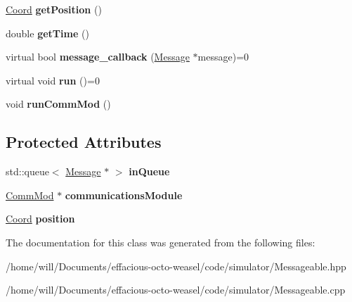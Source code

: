 \begin{DoxyCompactItemize}
\item 
\hyperlink{struct_coord}{Coord} {\bfseries get\+Position} ()\hypertarget{class_messageable_a7f990ea00748e817ef7a20dd9ab8e88c}{}\label{class_messageable_a7f990ea00748e817ef7a20dd9ab8e88c}

\item 
double {\bfseries get\+Time} ()\hypertarget{class_messageable_a695c9311c6ece88dd81ec325d24dc01e}{}\label{class_messageable_a695c9311c6ece88dd81ec325d24dc01e}

\item 
virtual bool {\bfseries message\+\_\+callback} (\hyperlink{class_message}{Message} $\ast$message)=0\hypertarget{class_messageable_adda0d24929a929b9d91c97da1fb91775}{}\label{class_messageable_adda0d24929a929b9d91c97da1fb91775}

\item 
virtual void {\bfseries run} ()=0\hypertarget{class_messageable_a82c2308b9fabe8e06664d17b3c018b75}{}\label{class_messageable_a82c2308b9fabe8e06664d17b3c018b75}

\item 
void {\bfseries run\+Comm\+Mod} ()\hypertarget{class_messageable_ab39d542fbac3744a22161efbe0dc9ff7}{}\label{class_messageable_ab39d542fbac3744a22161efbe0dc9ff7}

\end{DoxyCompactItemize}
\subsection*{Protected Attributes}
\begin{DoxyCompactItemize}
\item 
std\+::queue$<$ \hyperlink{class_message}{Message} $\ast$ $>$ {\bfseries in\+Queue}\hypertarget{class_messageable_a77bee602af65ca6708c3d77080298376}{}\label{class_messageable_a77bee602af65ca6708c3d77080298376}

\item 
\hyperlink{class_comm_mod}{Comm\+Mod} $\ast$ {\bfseries communications\+Module}\hypertarget{class_messageable_a0c8ed985c63492656ab9e6d502c8f98e}{}\label{class_messageable_a0c8ed985c63492656ab9e6d502c8f98e}

\item 
\hyperlink{struct_coord}{Coord} {\bfseries position}\hypertarget{class_messageable_a49ee36421becbc9f529f3d63d5e3169a}{}\label{class_messageable_a49ee36421becbc9f529f3d63d5e3169a}

\end{DoxyCompactItemize}


The documentation for this class was generated from the following files\+:\begin{DoxyCompactItemize}
\item 
/home/will/\+Documents/effacious-\/octo-\/weasel/code/simulator/Messageable.\+hpp\item 
/home/will/\+Documents/effacious-\/octo-\/weasel/code/simulator/Messageable.\+cpp\end{DoxyCompactItemize}
